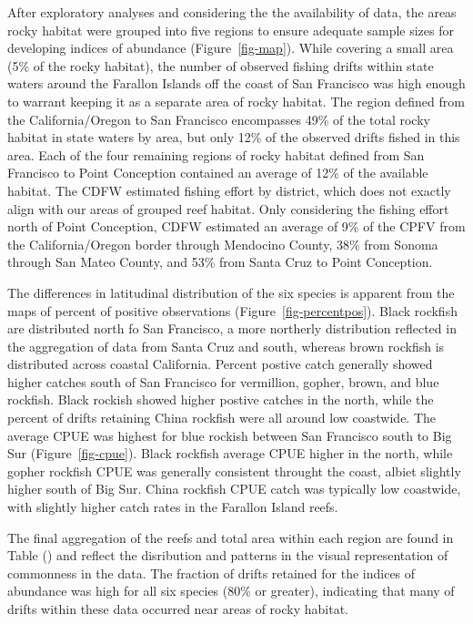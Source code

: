 \documentclass[
  12pt,
  authoryear,
  preprint,
  3p]{elsarticle}
\begin{document}
After exploratory analyses and considering the the availability of data,
the areas rocky habitat were grouped into five regions to ensure
adequate sample sizes for developing indices of abundance
(Figure~\ref{fig-map}). While covering a small area (5\% of the rocky
habitat), the number of observed fishing drifts within state waters
around the Farallon Islands off the coast of San Francisco was high
enough to warrant keeping it as a separate area of rocky habitat. The
region defined from the California/Oregon to San Francisco encompasses
49\% of the total rocky habitat in state waters by area, but only 12\%
of the observed drifts fished in this area. Each of the four remaining
regions of rocky habitat defined from San Francisco to Point Conception
contained an average of 12\% of the available habitat. The CDFW
estimated fishing effort by district, which does not exactly align with
our areas of grouped reef habitat. Only considering the fishing effort
north of Point Conception, CDFW estimated an average of 9\% of the CPFV
from the California/Oregon border through Mendocino County, 38\% from
Sonoma through San Mateo County, and 53\% from Santa Cruz to Point
Conception.

The differences in latitudinal distribution of the six species is
apparent from the maps of percent of positive observations
(Figure~\ref{fig-percentpos}). Black rockfish are distributed north fo
San Francisco, a more northerly distribution reflected in the
aggregation of data from Santa Cruz and south, whereas brown rockfish is
distributed across coastal California. Percent postive catch generally
showed higher catches south of San Francisco for vermillion, gopher,
brown, and blue rockfish. Black rockish showed higher postive catches in
the north, while the percent of drifts retaining China rockfish were all
around low coastwide. The average CPUE was highest for blue rockish
between San Francisco south to Big Sur (Figure~\ref{fig-cpue}). Black
rockfish average CPUE higher in the north, while gopher rockfish CPUE
was generally consistent throught the coast, albiet slightly higher
south of Big Sur. China rockfish CPUE catch was typically low coastwide,
with slightly higher catch rates in the Farallon Island reefs.

The final aggregation of the reefs and total area within each region are
found in Table () and reflect the disribution and patterns in the visual
representation of commonness in the data. The fraction of drifts
retained for the indices of abundance was high for all six species (80\%
or greater), indicating that many of drifts within these data occurred
near areas of rocky habitat.
\end{document}
